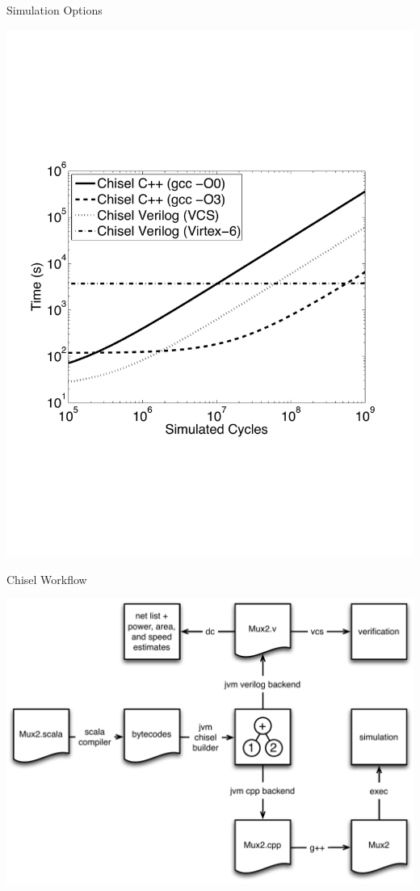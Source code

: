 \documentclass[xcolor=pdflatex,dvipsnames,table]{beamer}
\begin{document}
\begin{frame}{Simulation Options}
\begin{center}
\includegraphics[height=0.9\textheight]{../talks/dac12/figs/perf.pdf}
\end{center}
\end{frame}

\begin{frame}{Chisel Workflow}
\begin{center}
\includegraphics[height=0.9\textheight]{../bootcamp/figs/chisel-workflow.pdf}
\end{center}
\end{frame}
\end{document}
